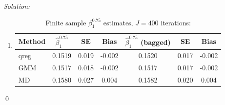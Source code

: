 \documentclass[12pt]{article}
\newenvironment{sol}
    {\emph{Solution:}
    }
    {
    \qed
    }
\begin{document}
\begin{sol}
\begin{enumerate}[label=\alph*) ]
    \item \begin{table}[htbp]
      \centering
      \caption{Finite sample $\beta_1^{0.75}$ estimates, $J = 400$ iterations:}
        \begin{tabular}{lcccccc}
            \toprule
              Method          & $\hat{\beta}_1^{0.75}$  & SE & Bias & $\hat{\beta}_1^{0.75}$ (bagged) & SE & Bias        \\
            \midrule
            qreg & 0.1519 & 0.019 & -0.002 &0.1520 & 0.017 &-0.002 \\
              GMM & 0.1517& 0.018& -0.002 &0.1517 & 0.017 & -0.002\\
              MD & 0.1580& 0.027 & 0.004 &0.1582 &0.020 & 0.004 \\
            \bottomrule
        \end{tabular}
      \label{tab:bagged_400}
    \end{table}


\end{enumerate}
\end{sol}
\end{document}

